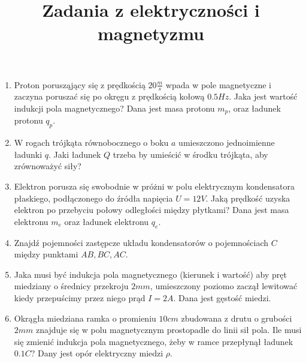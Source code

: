 \documentclass{../notatki}
\title{Zadania z elektryczności i magnetyzmu}
\begin{document}
\begin{enumerate}
  \item Proton porusząjący się z prędkością $20 \frac{m}{s}$ wpada w
    pole magnetyczne i zaczyna poruszać się po okręgu z prędkością
    kołową $0.5 Hz$. Jaka jest wartość indukcji pola magnetycznego?
    Dana jest masa protonu $m_p$, oraz ładunek protonu $q_p$.
  \item W rogach trójkąta równobocznego o boku $a$ umieszczono
    jednoimienne ładunki $q$. Jaki ładunek $Q$ trzeba by umieścić w
    środku trójkąta, aby zrównoważyć siły?
  \item Elektron porusza się swobodnie w próżni w polu elektrycznym
    kondensatora płaskiego, podłączonego do źródła napięcia $U =
    12V$. Jaką prędkość uzyska elektron po przebyciu połowy
    odległości między płytkami? Dana jest masa elektronu $m_e$ oraz
    ładunek elektronu $q_e$.
  \item Znajdź pojemności zastępcze układu kondensatorów o pojemnościach $C$
    między punktami $AB, BC, AC$.
    \begin{figure*}[h]
      \centering
    \end{figure*}

  \item Jaka musi być indukcja pola magnetycznego (kierunek i wartość) aby pręt
    miedziany o średnicy przekroju $2 mm$, umieszczony poziomo zaczął lewitować
    kiedy przepuścimy przez niego prąd $I = 2A$. Dana jest gęstość
    miedzi.
  \item Okrągła miedziana ramka o promieniu $10 cm$ zbudowana z drutu o grubości
    $2 mm$ znajduje się w polu magnetycznym prostopadle do linii sił
    pola. Ile musi
    się zmienić indukcja pola magnetycznego, żeby w ramce przepłynął
    ładunek $0.1 C$? Dany jest opór elektryczny miedzi $\rho$.
\end{enumerate}
\end{document}
